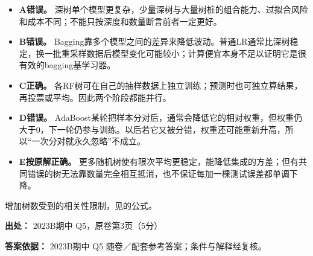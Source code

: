 
\begin{itemize}

\item \textbf{A错误。} 深树单个模型更复杂，少量深树与大量树桩的组合能力、过拟合风险和成本不同；不能只按深度和数量断言前者一定更好。

\item \textbf{B错误。} Bagging靠多个模型之间的差异来降低波动。普通LR通常比深树稳定，换一批重采样数据后模型变化可能较小；计算便宜本身不足以证明它是很有效的bagging基学习器。

\item \textbf{C正确。} 各RF树可在自己的抽样数据上独立训练；预测时也可独立算结果，再投票或平均。因此两个阶段都能并行。

\item \textbf{D错误。} AdaBoost某轮把样本分对后，通常会降低它的相对权重，但权重仍大于0，下一轮仍参与训练。以后若它又被分错，权重还可能重新升高，所以“一次分对就永久忽略”不成立。

\item \textbf{E按原解正确。} 更多随机树使有限次平均更稳定，能降低集成的方差；但有共同错误的树无法靠数量完全相互抵消，也不保证每加一棵测试误差都单调下降。

\end{itemize}


增加树数受到的相关性限制，见的公式。


\textbf{出处：} 2023B期中 Q5，原卷第3页（5分）


\textbf{答案依据：} 2023B期中 Q5 随卷／配套参考答案；条件与解释经复核。

